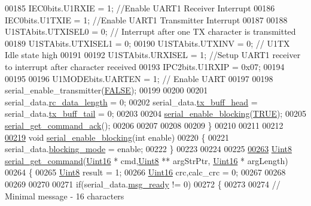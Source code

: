 \begin{DoxyCode}
00185     IEC0bits.U1RXIE   = 1;      \textcolor{comment}{//Enable UART1 Receiver Interrupt}
00186     IEC0bits.U1TXIE   = 1;      \textcolor{comment}{//Enable UART1 Transmitter Interrupt}
00187 
00188     U1STAbits.UTXISEL0 = 0;     \textcolor{comment}{// Interrupt after one TX character is transmitted}
00189     U1STAbits.UTXISEL1 = 0;
00190     U1STAbits.UTXINV   = 0;     \textcolor{comment}{// U1TX Idle state high}
00191 
00192     U1STAbits.URXISEL  = 1;     \textcolor{comment}{//Setup UART1  receiver to interrupt after character received}
00193     IPC2bits.U1RXIP    = 0x07;
00194     
00195 
00196     U1MODEbits.UARTEN  = 1;     \textcolor{comment}{// Enable UART}
00197 
00198     serial\_enable\_transmitter(\hyperlink{a00038_aa93f0eb578d23995850d61f7d61c55c1}{FALSE});
00199     
00200 
00201     serial\_data.\hyperlink{a00028_ab136d4fef2c523afd55b6ca74c46d7cc}{rc\_data\_length} = 0;
00202     serial\_data.\hyperlink{a00028_a3e2eda0a020422511de91b2bc7386083}{tx\_buff\_head} = serial\_data.\hyperlink{a00028_a6287e1447d7902b8bbc2f6359065dcbd}{tx\_buff\_tail} = 0;
00203 
00204     \hyperlink{a00028_af15ca641f181de14f789d97b00c367ef}{serial\_enable\_blocking}(\hyperlink{a00038_aa8cecfc5c5c054d2875c03e77b7be15d}{TRUE});
00205     \hyperlink{a00028_a7fc7421ed15d6e4516e9878e7455d715}{serial\_get\_command\_ack}();
00206 
00207 
00208 
00209 \}
00210 
00211 
00212 
\hypertarget{a00028_source_l00219}{}\hyperlink{a00028_af15ca641f181de14f789d97b00c367ef}{00219} \textcolor{keywordtype}{void}    \hyperlink{a00028_af15ca641f181de14f789d97b00c367ef}{serial\_enable\_blocking}(\textcolor{keywordtype}{int} enable)
00220 \{
00221         serial\_data.\hyperlink{a00028_a758ac775caab1899af08024d4635f7e3}{blocking\_mode} = enable;
00222 \}
00223 
00224 
00225 
\hypertarget{a00028_source_l00263}{}\hyperlink{a00028_a366b2707f4c7d76f0efc1b5cdde8e37e}{00263} \hyperlink{a00070_af84840501dec18061d18a68c162a8fa2}{Uint8}   \hyperlink{a00028_a366b2707f4c7d76f0efc1b5cdde8e37e}{serial\_get\_command}(\hyperlink{a00070_a59a9f6be4562c327cbfb4f7e8e18f08b}{Uint16} * cmd,\hyperlink{a00070_af84840501dec18061d18a68c162a8fa2}{Uint8} ** argStrPtr,
      \hyperlink{a00070_a59a9f6be4562c327cbfb4f7e8e18f08b}{Uint16} * argLength)
00264 \{
00265     \hyperlink{a00070_af84840501dec18061d18a68c162a8fa2}{Uint8} result = 1;
00266     \hyperlink{a00070_a59a9f6be4562c327cbfb4f7e8e18f08b}{Uint16} crc,calc\_crc = 0;
00267    
00268 
00269     
00270 
00271     \textcolor{keywordflow}{if}(serial\_data.\hyperlink{a00028_ac0789a6c9ab7ccd13d6f04ae31496854}{msg\_ready} != 0)
00272     \{
00273 
00274         \textcolor{comment}{// Minimal message - 16 characters}

\end{DoxyCode}
